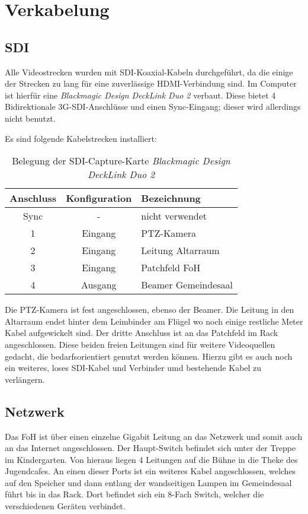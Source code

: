 \chapter{Verkabelung}
	\section{SDI}
		Alle Videostrecken wurden mit \Gls{SDI}-Koaxial-Kabeln durchgeführt, da die einige der Strecken zu lang für eine zuverlässige HDMI-Verbindung sind.
		Im Computer ist hierfür eine \textit{Blackmagic Design DeckLink Duo 2} verbaut.
		Diese bietet 4 Bidirektionale 3G-\Gls{SDI}-Anschlüsse und einen Sync-Eingang; dieser wird allerdings nicht benutzt.

		Es sind folgende Kabelstrecken installiert:
		\begin{table}[h]
			\caption{Belegung der \Gls{SDI}-Capture-Karte \textit{Blackmagic Design DeckLink Duo 2}}
			\centering
			
			\begin{tabular}{ccl}
				\toprule
				Anschluss & Konfiguration & Bezeichnung \\
				\midrule
				Sync & - & nicht verwendet \\
				1 & Eingang & \Gls{PTZ-Kamera} \\
				2 & Eingang & Leitung Altarraum \\
				3 & Eingang & Patchfeld \Gls{FoH} \\
				4 & Ausgang & Beamer Gemeindesaal \\
				\bottomrule
			\end{tabular}
		\end{table}

		Die PTZ-Kamera ist fest angeschlossen, ebenso der Beamer.
		Die Leitung in den Altarraum endet hinter dem Leimbinder am Flügel wo noch einige restliche Meter Kabel aufgewickelt sind.
		Der dritte Anschluss ist an das Patchfeld im Rack angeschlossen.
		Diese beiden freien Leitungen sind für weitere Videoquellen gedacht, die bedarfsorientiert genutzt werden können.
		Hierzu gibt es auch noch ein weiteres, loses \Gls{SDI}-Kabel und Verbinder umd bestehende Kabel zu verlängern.

	\section{Netzwerk}
		Das \Gls{FoH} ist über einen einzelne Gigabit Leitung an das Netzwerk und somit auch an das Internet angeschlossen.
		Der Haupt-Switch befindet sich unter der Treppe im Kindergarten.
		Von hieraus liegen 4 Leitungen auf die Bühne in die Theke des Jugendcafes.
		An einen dieser Ports ist ein weiteres Kabel angeschlossen, welches auf den Speicher und dann entlang der wandseitigen Lampen im Gemeindesaal führt bis in das Rack.
		Dort befindet sich ein 8-Fach Switch, welcher die verschiedenen Geräten verbindet.

